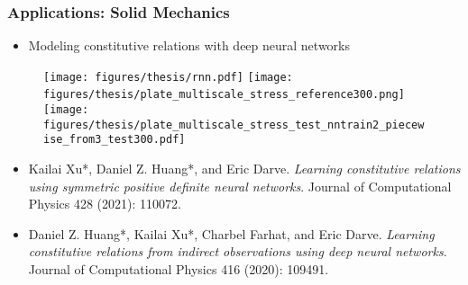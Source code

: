\documentclass[usenames,dvipsnames]{beamer}
\begin{document}
\begin{frame}
	\frametitle{Applications: Solid Mechanics}
	\begin{itemize}
\item Modeling constitutive relations with deep neural networks

	\end{itemize}
		\begin{figure}[hbt]
		\centering
		\texttt{[image: figures/thesis/rnn.pdf]}
	\texttt{[image: figures/thesis/plate\_multiscale\_stress\_reference300.png]}~
	\texttt{[image: figures/thesis/plate\_multiscale\_stress\_test\_nntrain2\_piecewise\_from3\_test300.pdf]}
		\end{figure}
			
			\vspace{-0.2cm}
		{
			\tiny
			
			\begin{itemize}
				\item[] Kailai Xu*, Daniel Z. Huang*, and Eric Darve. \textit{Learning constitutive relations using symmetric positive definite neural networks}. Journal of Computational Physics 428 (2021): 110072.
				\item[] Daniel Z. Huang*, Kailai Xu*, Charbel Farhat, and Eric Darve. \textit{Learning constitutive relations from indirect observations using deep neural networks}. Journal of Computational Physics 416 (2020): 109491.
			\end{itemize}
			
			
			
		}
\end{frame}
\end{document}
